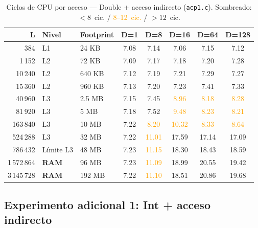 \documentclass[12pt,a4paper]{article}
\newcommand{\verde}[1]{\textcolor{verde}{#1}}
\newcommand{\amarillo}[1]{\textcolor{orange}{#1}}
\newcommand{\rojo}[1]{\textcolor{rojo}{#1}}
\begin{document}
\begin{table}[H]
\centering
\caption{Ciclos de CPU por acceso — Double + acceso indirecto (\texttt{acp1.c}). Sombreado: \verde{$<8$~cic.} / \amarillo{8--12~cic.} / \rojo{$>12$~cic.}}
\label{tab:double_ind}
\setlength{\tabcolsep}{5pt}
\begin{tabular}{rllccccc}
\toprule
\textbf{L} & \textbf{Nivel} & \textbf{Footprint} & \textbf{D=1} & \textbf{D=8} & \textbf{D=16} & \textbf{D=64} & \textbf{D=128} \\
\midrule
384        & L1         & 24 KB   & \verde{7.08} & \verde{7.14} & \verde{7.06} & \verde{7.15} & \verde{7.12} \\
1\,152     & L2         & 72 KB   & \verde{7.09} & \verde{7.17} & \verde{7.18} & \verde{7.20} & \verde{7.28} \\
10\,240    & L2         & 640 KB  & \verde{7.12} & \verde{7.19} & \verde{7.21} & \verde{7.29} & \verde{7.27} \\
15\,360    & L2         & 960 KB  & \verde{7.13} & \verde{7.20} & \verde{7.23} & \verde{7.41} & \verde{7.33} \\
40\,960    & L3         & 2.5 MB  & \verde{7.15} & \verde{7.45} & \amarillo{8.96} & \amarillo{8.18} & \amarillo{8.28} \\
81\,920    & L3         & 5 MB    & \verde{7.18} & \verde{7.52} & \amarillo{9.48} & \amarillo{8.23} & \amarillo{8.21} \\
163\,840   & L3         & 10 MB   & \verde{7.22} & \amarillo{8.20} & \amarillo{10.32} & \amarillo{8.33} & \amarillo{8.64} \\
524\,288   & L3         & 32 MB   & \verde{7.22} & \amarillo{11.01} & \rojo{17.59} & \rojo{17.14} & \rojo{17.09} \\
786\,432   & Límite L3  & 48 MB   & \verde{7.23} & \amarillo{11.15} & \rojo{18.30} & \rojo{18.43} & \rojo{18.59} \\
1\,572\,864 & \textbf{RAM} & 96 MB & \verde{7.23} & \amarillo{11.09} & \rojo{18.99} & \rojo{20.55} & \rojo{19.42} \\
3\,145\,728 & \textbf{RAM} & 192 MB & \verde{7.22} & \amarillo{11.10} & \rojo{18.51} & \rojo{20.86} & \rojo{19.68} \\
\bottomrule
\end{tabular}
\end{table}

\subsection{Experimento adicional 1: Int + acceso indirecto}
\end{document}
